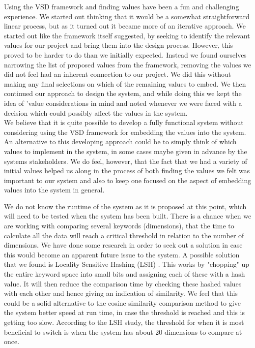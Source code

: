 Using the VSD framework and finding values have been a fun and challenging experience. We started out thinking that it would be a somewhat straightforward linear process, but as it turned out it became more of an iterative approach. We started out like the framework itself suggested, by seeking to identify the relevant values for our project and bring them into the design process. However, this proved to be harder to do than we initially expected. Instead we found ourselves narrowing the list of proposed values from the framework, removing the values we did not feel had an inherent connection to our project. We did this without making any final selections on which of the remaining values to embed. We then continued our approach to design the system, and while doing this we kept the idea of 'value considerations in mind and noted whenever we were faced with a decision which could possibly affect the values in the system. \\
We believe that it is quite possible to develop a fully functional system without considering using the VSD framework for embedding the values into the system. An alternative to this developing approach could be to simply think of which values to implement in the system, in some cases maybe given in advance by the systems stakeholders. We do feel, however, that the fact that we had a variety of initial values helped us along in the process of both finding the values we felt was important to our system and also to keep one focused on the aspect of embedding values into the system in general.

We do not know the runtime of the system as it is proposed at this point, which will need to be tested when the system has been built. There is a chance when we are working with comparing several keywords (dimensions), that the time to calculate all the data will reach a critical threshold in relation to the number of dimensions.  We have done some research in order to seek out a solution in case this would become an apparent future issue to the system. A possible solution that we found is Locality Sensitive Hashing (LSH) . This works by "chopping" up the entire keyword space into small bits and assigning each of these with a hash value. It will then reduce the   comparison time by checking these hashed values with each other and hence giving an indication of similarity. We feel that this could be a solid alternative to the cosine similarity comparison method to give the system better speed at run time, in case the threshold is reached and this is getting too slow. According to the LSH study, the threshold for when it is most beneficial to switch is when the system has about 20 dimensions to compare at once.





